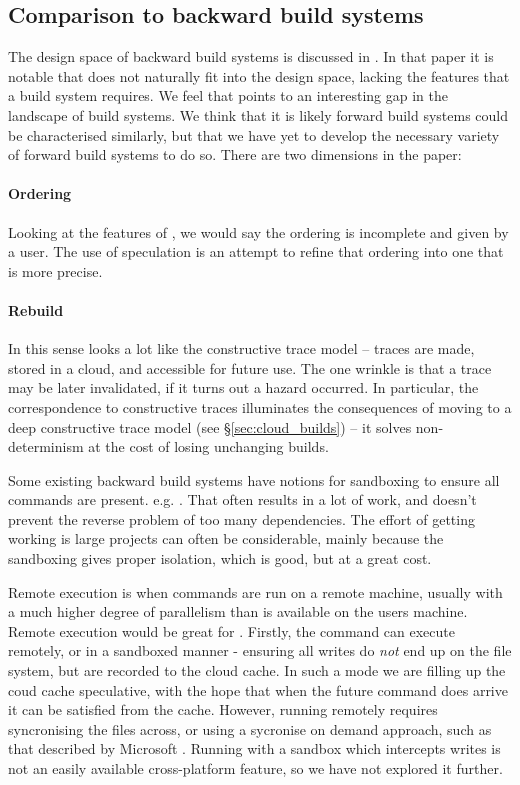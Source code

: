 \subsection{Comparison to backward build systems}

The design space of backward build systems is discussed in \cite{build_systems_a_la_carte}. In that paper it is notable that \Fabricate does not naturally fit into the design space, lacking the features that a build system requires. We feel that points to an interesting gap in the landscape of build systems. We think that it is likely forward build systems could be characterised similarly, but that we have yet to develop the necessary variety of forward build systems to do so. There are two dimensions in the paper:

\paragraph{Ordering} Looking at the features of \Rattle, we would say the ordering is incomplete and given by a user. The use of speculation is an attempt to refine that ordering into one that is more precise.

\paragraph{Rebuild} In this sense \Rattle looks a lot like the constructive trace model -- traces are made, stored in a cloud, and accessible for future use. The one wrinkle is that a trace may be later invalidated, if it turns out a hazard occurred. In particular, the correspondence to constructive traces illuminates the consequences of moving to a deep constructive trace model (see \S\ref{sec:cloud_builds}) -- it solves non-determinism at the cost of losing unchanging builds.

Some existing backward build systems have notions for sandboxing to ensure all commands are present. e.g. \Bazel \cite{bazel}. That often results in a lot of work, and doesn't prevent the reverse problem of too many dependencies. The effort of getting \Bazel working is large projects can often be considerable, mainly because the sandboxing gives proper isolation, which is good, but at a great cost.

Remote execution is when commands are run on a remote machine, usually with a much higher degree of parallelism than is available on the users machine. Remote execution would be great for \Rattle. Firstly, the command can execute remotely, or in a sandboxed manner - ensuring all writes do \emph{not} end up on the file system, but are recorded to the cloud cache. In such a mode we are filling up the coud cache speculative, with the hope that when the future command does arrive it can be satisfied from the cache. However, running remotely requires syncronising the files across, or using a sycronise on demand approach, such as that described by Microsoft \cite{}. Running with a sandbox which intercepts writes is not an easily available cross-platform feature, so we have not explored it further.

